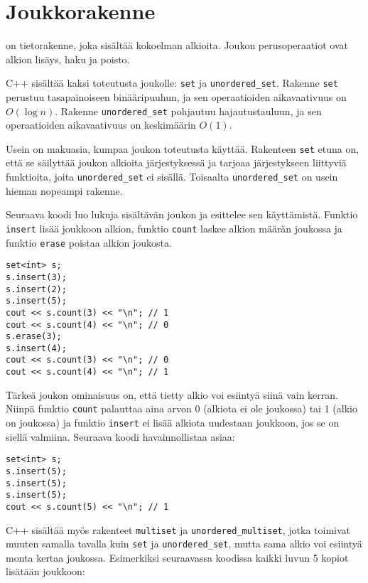 \section{Joukkorakenne}



 on tietorakenne,
joka sisältää kokoelman alkioita.
Joukon perusoperaatiot ovat alkion lisäys,
haku ja poisto.

C++ sisältää kaksi
toteutusta joukolle: \texttt{set} ja \texttt{unordered\_set}.
Rakenne \texttt{set} perustuu tasapainoiseen
binääripuuhun, ja sen operaatioiden aikavaativuus
on $O(\log n)$.
Rakenne \texttt{unordered\_set} pohjautuu hajautustauluun,
ja sen operaatioiden aikavaativuus on keskimäärin $O(1)$.

Usein on makuasia, kumpaa joukon toteutusta käyttää.
Rakenteen \texttt{set} etuna on, että se säilyttää
joukon alkioita järjestyksessä ja tarjoaa
järjestykseen liittyviä funktioita,
joita \texttt{unordered\_set} ei sisällä.
Toisaalta \texttt{unordered\_set} on usein hieman nopeampi
rakenne.

Seuraava koodi luo lukuja sisältävän joukon ja
esittelee sen käyttämistä.
Funktio \texttt{insert} lisää joukkoon alkion,
funktio \texttt{count} laskee alkion määrän joukossa
ja funktio \texttt{erase} poistaa alkion joukosta.

\begin{lstlisting}
set<int> s;
s.insert(3);
s.insert(2);
s.insert(5);
cout << s.count(3) << "\n"; // 1
cout << s.count(4) << "\n"; // 0
s.erase(3);
s.insert(4);
cout << s.count(3) << "\n"; // 0
cout << s.count(4) << "\n"; // 1
\end{lstlisting}

Tärkeä joukon ominaisuus on,
että tietty alkio voi esiintyä siinä
vain kerran.
Niinpä funktio \texttt{count} palauttaa aina
arvon 0 (alkiota ei ole joukossa) tai 1 (alkio on joukossa)
ja funktio \texttt{insert} ei lisää alkiota
uudestaan joukkoon, jos se on siellä valmiina.
Seuraava koodi havainnollistaa asiaa:

\begin{lstlisting}
set<int> s;
s.insert(5);
s.insert(5);
s.insert(5);
cout << s.count(5) << "\n"; // 1
\end{lstlisting}


C++ sisältää myös rakenteet
\texttt{multiset} ja \texttt{unordered\_multiset},
jotka toimivat muuten samalla tavalla kuin \texttt{set}
ja \texttt{unordered\_set},
mutta sama alkio voi esiintyä
monta kertaa joukossa.
Esimerkiksi seuraavassa koodissa
kaikki luvun 5 kopiot lisätään joukkoon:

